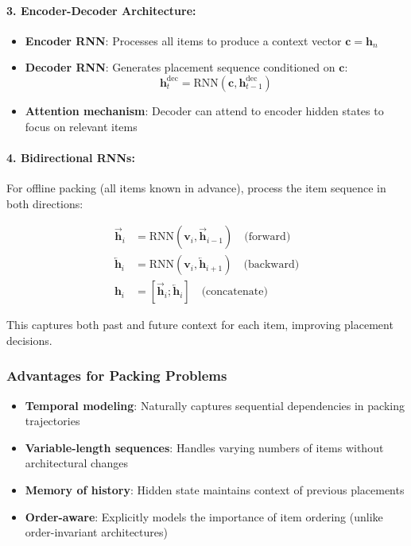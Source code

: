 \paragraph{3. Encoder-Decoder Architecture:}

\begin{itemize}
\item \textbf{Encoder RNN}: Processes all items to produce a context vector $\mathbf{c} = \mathbf{h}_n$
\item \textbf{Decoder RNN}: Generates placement sequence conditioned on $\mathbf{c}$:
  \begin{equation}
  \mathbf{h}_t^{\text{dec}} = \text{RNN}(\mathbf{c}, \mathbf{h}_{t-1}^{\text{dec}})
  \end{equation}
\item \textbf{Attention mechanism}: Decoder can attend to encoder hidden states to focus on relevant items
\end{itemize}

\paragraph{4. Bidirectional RNNs:}

For offline packing (all items known in advance), process the item sequence in both directions:

\begin{align}
\overrightarrow{\mathbf{h}}_i &= \text{RNN}(\mathbf{v}_i, \overrightarrow{\mathbf{h}}_{i-1}) \quad \text{(forward)} \\
\overleftarrow{\mathbf{h}}_i &= \text{RNN}(\mathbf{v}_i, \overleftarrow{\mathbf{h}}_{i+1}) \quad \text{(backward)} \\
\mathbf{h}_i &= [\overrightarrow{\mathbf{h}}_i; \overleftarrow{\mathbf{h}}_i] \quad \text{(concatenate)}
\end{align}

This captures both past and future context for each item, improving placement decisions.

\subsubsection{Advantages for Packing Problems}

\begin{itemize}
\item \textbf{Temporal modeling}: Naturally captures sequential dependencies in packing trajectories
\item \textbf{Variable-length sequences}: Handles varying numbers of items without architectural changes
\item \textbf{Memory of history}: Hidden state maintains context of previous placements
\item \textbf{Order-aware}: Explicitly models the importance of item ordering (unlike order-invariant architectures)
\end{itemize}

